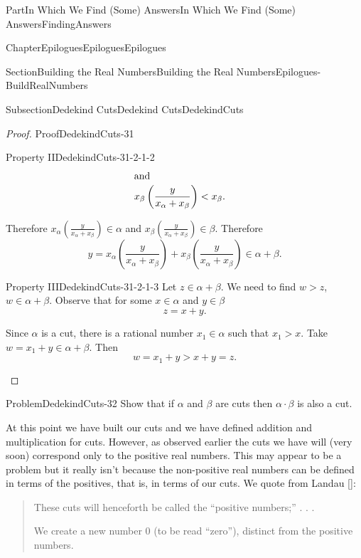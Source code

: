 \documentclass[oneside,10pt,]{book}
\newcommand{\xreffont}{\relax}
\numberwithin{equation}{part}
\newcommand{\lt}{<}
\newcommand{\amp}{&}
\begin{document}
\begin{partptx}{Part}{In Which We Find (Some) Answers}{}{In Which We Find (Some) Answers}{}{}{FindingAnswers}
\begin{chapterptx}{Chapter}{Epilogues}{}{Epilogues}{}{}{Epilogues}
\begin{sectionptx}{Section}{Building the Real Numbers}{}{Building the Real Numbers}{}{}{Epilogues-BuildRealNumbers}
\begin{subsectionptx}{Subsection}{Dedekind Cuts}{}{Dedekind Cuts}{}{}{DedekindCuts}
\begin{proof}{Proof}{}{DedekindCuts-31}
\begin{descriptionlist}
\begin{dlimedium}{Property II}{DedekindCuts-31-2-1-2}
\begin{align*}
\intertext{and}
x_\beta\left(\frac{y}{x_\alpha+x_\beta}\right)\amp \lt  x_\beta\text{.}
\end{align*}
%
\par
Therefore \(x_\alpha\left(\frac{y}{x_\alpha+x_\beta}\right)\in\alpha\) and \(x_\beta\left(\frac{y}{x_\alpha+x_\beta}\right)\in\beta\). Therefore%
\begin{equation*}
y=x_\alpha\left(\frac{y}{x_\alpha+x_\beta}\right)+x_\beta\left(\frac{y}{x_\alpha+x_\beta}\right)\in\alpha+\beta\text{.}
\end{equation*}
%
\end{dlimedium}%
\begin{dlimedium}{Property III}{DedekindCuts-31-2-1-3}%
Let \(z\in\alpha+\beta\).  We need to find \(w>z\), \(w\in\alpha+\beta\).  Observe that for some \(x\in\alpha\) and \(y\in\beta\)%
\begin{equation*}
z=x+y\text{.}
\end{equation*}
%
\par
Since \(\alpha\) is a cut, there is a rational number \(x_1\in\alpha\) such that \(x_1>x\). Take \(w=x_1+y\in\alpha+\beta\).  Then%
\begin{equation*}
w=x_1+y>x+y=z\text{.}
\end{equation*}
%
\end{dlimedium}%
\end{descriptionlist}
%
\end{proof}
\begin{problem}{Problem}{}{DedekindCuts-32}%
Show that if \(\alpha\) and \(\beta\) are cuts then \(\alpha\cdot\beta\) is also a cut.%
\end{problem}
At this point we have built our cuts and we have defined addition and multiplication for cuts.  However, as observed earlier the cuts we have will (very soon) correspond only to the positive real numbers.  This may appear to be a problem but it really isn't because the non-positive real numbers can be defined in terms of the positives, that is, in terms of our cuts.  We quote from Landau \hyperlink{landau66__found_analy}{[{\xreffont 7}]}:%
\begin{quote}%
These cuts will henceforth be called the ``positive numbers;''  .  .  .%
\par
We create a new number \(0\) (to be read ``zero''), distinct from the positive numbers.%
\par

\end{quote}
\end{subsectionptx}
\end{sectionptx}
\end{chapterptx}
\end{partptx}
\end{document}
